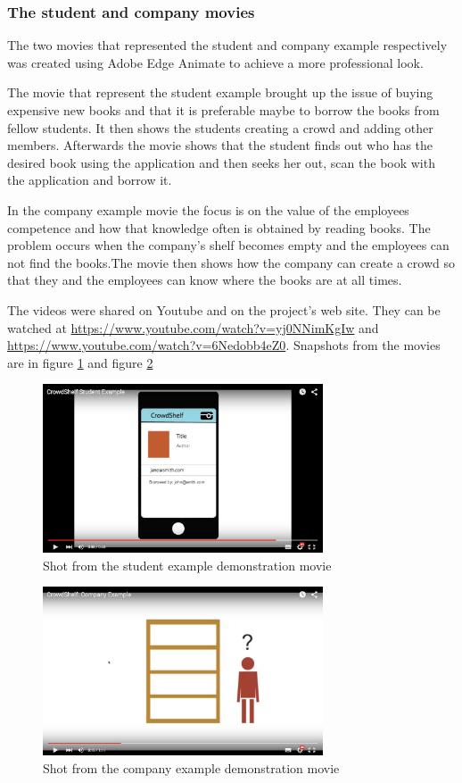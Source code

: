 \subsubsection{The student and company movies} 
The two movies that represented the student and company example respectively was created using Adobe Edge Animate to achieve a more professional look. 

The movie that represent the student example brought up the issue of buying expensive new books and that it is preferable maybe to borrow the books from fellow students. It then shows the students creating a crowd and adding other members. Afterwards the movie shows that the student finds out who has the desired book using the application and then seeks her out, scan the book with the application and borrow it. 

In the company example movie the focus is on the value of the employees competence and how that knowledge often is obtained by reading books. The problem occurs when the company’s shelf becomes empty and the employees can not find the books.The movie then shows how the company can create a crowd so that they and the employees can know where the books are at all times.

The videos were shared on Youtube and on the project's web site. They can be watched at \url{https://www.youtube.com/watch?v=yj0NNimKgIw} and \url{https://www.youtube.com/watch?v=6Nedobb4eZ0}. Snapshots from the movies are in figure \ref{fig:student-example} and figure \ref{fig:company-example}
\begin{figure}
\centering
\includegraphics[height=5cm]{figs/v01/InfoMovieStudent2.png}
\caption{Shot from the student example demonstration movie}
\label{fig:student-example}
\end{figure}

\begin{figure}
\centering
\includegraphics[height=5cm]{figs/v01/InfoMovieCompany1.png}
\caption{Shot from the company example demonstration movie}
\label{fig:company-example}
\end{figure}

